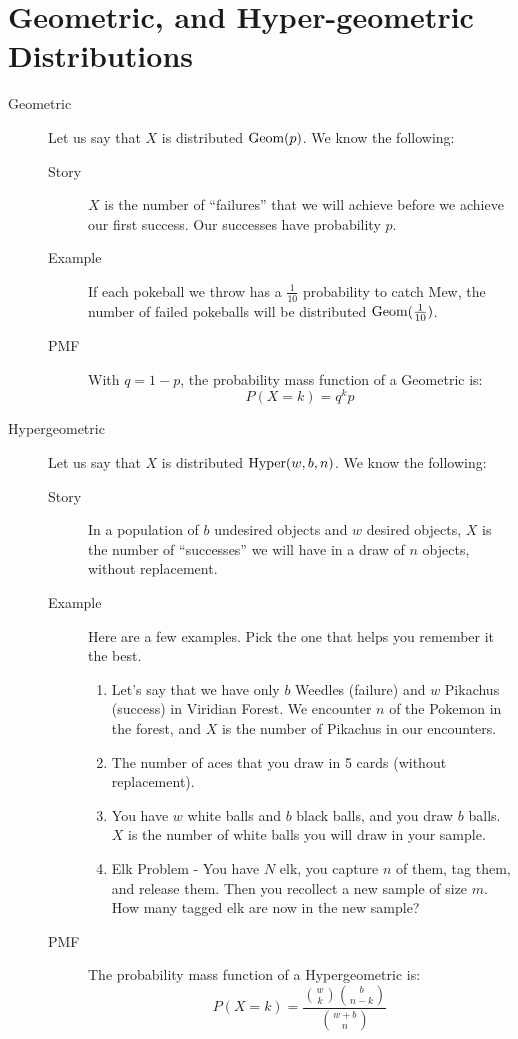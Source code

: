 \documentclass[11pt]{article}
\begin{document}
\section*{Geometric, and Hyper-geometric Distributions}

\begin{description}

\item[Geometric] Let us say that $X$ is distributed $\textrm{Geom}(p)$. We know the following:

\begin{description}
  \item[Story] $X$ is the number of ``failures'' that we will achieve before we achieve our first success. Our successes have probability $p$.
  \item[Example] If each pokeball we throw has a $\frac{1}{10}$ probability to catch Mew, the number of failed pokeballs will be distributed $\textrm{Geom}(\frac{1}{10})$.
  \item[PMF] With $q = 1-p$, the probability mass function of a Geometric is:
\[P(X = k) = q^kp\]
\end{description}

\item[Hypergeometric] Let us say that $X$ is distributed $\textrm{Hyper}(w, b, n)$. We know the following:
\begin{description}
  \item[Story] In a population of $b$ undesired objects and $w$ desired objects, $X$ is the number of ``successes'' we will have in a draw of $n$ objects, without replacement.
  \item[Example]
  Here are a few examples. Pick the one that helps you remember it the best.
  \begin{enumerate}
  \item Let's say that we have only $b$ Weedles (failure) and $w$ Pikachus (success) in Viridian Forest. We encounter $n$ of the Pokemon in the forest, and $X$ is the number of Pikachus in our encounters.
  \item The number of aces that you draw in 5 cards (without replacement).
  \item You have $w$ white balls and $b$ black balls, and you draw $b$ balls. $X$ is the number of white balls you will draw in your sample.
  \item Elk Problem - You have $N$ elk, you capture $n$ of them, tag them, and release them. Then you recollect a new sample of size $m$. How many tagged elk are now in the new sample?
  \end{enumerate}
  \item[PMF] The probability mass function of a Hypergeometric is:
\[P(X = k) = \frac{{w \choose k}{b \choose n-k}}{{w + b \choose n}}\]
\end{description}
\end{description}
\end{document}
